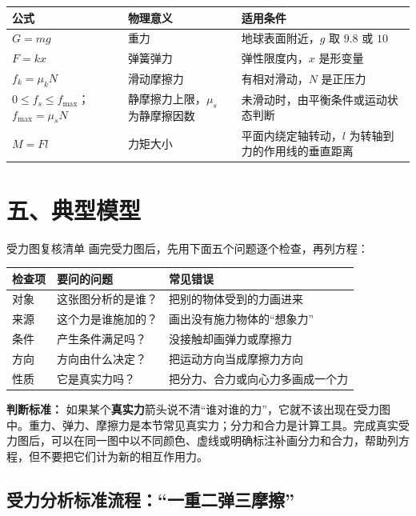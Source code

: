 \begin{center}
\begin{tabular}{p{}p{}p{}}
\toprule
公式 & 物理意义 & 适用条件 \\
\midrule
$G = mg$ & 重力 & 地球表面附近，$g$ 取 $9.8$ 或 $10$ \\
$F = kx$ & 弹簧弹力 & 弹性限度内，$x$ 是形变量 \\
$f_k = \mu_k N$ & 滑动摩擦力 & 有相对滑动，$N$ 是正压力 \\
$0 \leq f_s \leq f_{\max}$；$f_{\max}=\mu_s N$ & 静摩擦力上限，$\mu_s$ 为静摩擦因数 & 未滑动时，由平衡条件或运动状态判断 \\
$M=Fl$ & 力矩大小 & 平面内绕定轴转动，$l$ 为转轴到力的作用线的垂直距离 \\
\bottomrule
\end{tabular}
\end{center}

\section*{五、典型模型}

\begin{learningbox}{受力图复核清单}
画完受力图后，先用下面五个问题逐个检查，再列方程：

\begin{center}
\begin{tabular}{lll}
\toprule
检查项 & 要问的问题 & 常见错误 \\
\midrule
对象 & 这张图分析的是谁？ & 把别的物体受到的力画进来 \\
来源 & 这个力是谁施加的？ & 画出没有施力物体的“想象力” \\
条件 & 产生条件满足吗？ & 没接触却画弹力或摩擦力 \\
方向 & 方向由什么决定？ & 把运动方向当成摩擦力方向 \\
性质 & 它是真实力吗？ & 把分力、合力或向心力多画成一个力 \\
\bottomrule
\end{tabular}
\end{center}

\textbf{判断标准：} 如果某个\textbf{真实力}箭头说不清“谁对谁的力”，它就不该出现在受力图中。重力、弹力、摩擦力是本节常见真实力；分力和合力是计算工具。完成真实受力图后，可以在同一图中以不同颜色、虚线或明确标注补画分力和合力，帮助列方程，但不要把它们计为新的相互作用力。
\end{learningbox}

\subsection*{受力分析标准流程：“一重二弹三摩擦”}

